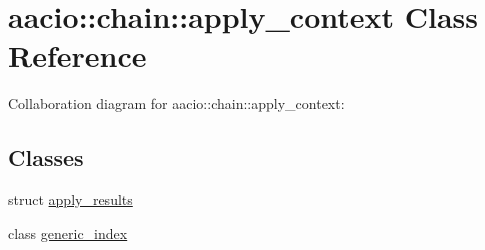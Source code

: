 \hypertarget{classaacio_1_1chain_1_1apply__context}{}\section{aacio\+:\+:chain\+:\+:apply\+\_\+context Class Reference}
\label{classaacio_1_1chain_1_1apply__context}


Collaboration diagram for aacio\+:\+:chain\+:\+:apply\+\_\+context\+:
\subsection*{Classes}
\begin{DoxyCompactItemize}
\item 
struct \mbox{\hyperlink{structaacio_1_1chain_1_1apply__context_1_1apply__results}{apply\+\_\+results}}
\item 
class \mbox{\hyperlink{classaacio_1_1chain_1_1apply__context_1_1generic__index}{generic\+\_\+index}}
\end{DoxyCompactItemize}
